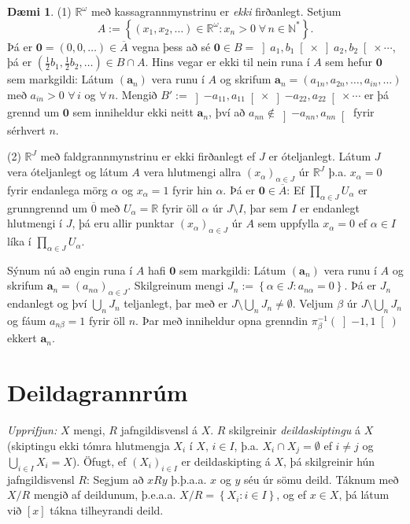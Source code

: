 \documentclass[a4paper,icelandic]{book}
\theoremstyle{definition}
\newtheorem{daemi}{Dæmi}[section]
\theoremstyle{plain}
\theoremstyle{remark}
\newcommand{\R}{\mathbb{R}} %
\newcommand{\N}{\mathbb{N}} %
\begin{document}
\begin{daemi}
  (1) $\R^\omega$ með kassagrannmynstrinu er \emph{ekki} firðanlegt. Setjum\[
  A := \left\{ (x_1,x_2,\dots)\in\R^\omega : x_n>0\;\forall\,n\in\N^* \right\}.
  \]
  Þá er $\mathbf 0 = \left( 0,0,\dots \right)\in \overline A$ vegna þess að
  sé $\mathbf 0\in B = \left] a_1,b_1 \right[\times\left] a_2,b_2
  \right[\times\cdots$, þá er $(\frac 12 b_1, \frac 12 b_2,\dots)\in B\cap A$.
  Hins vegar er ekki til nein runa í $A$ sem hefur $\mathbf 0$ sem markgildi:
  Látum $(\mathbf a_n)$ vera runu í $A$ og skrifum $\mathbf a_n =
  (a_{1n},a_{2n},\dots,a_{in},\dots)$ með $a_{in}>0$ $\forall\,i$ og $\forall\,n$.
  Mengið $B' := \left] -a_{11},a_{11} \right[\times\left] -a_{22},a_{22}
  \right[\times\cdots$ er þá grennd um $\mathbf 0$ sem inniheldur ekki neitt
  $\mathbf a_n$, því að $a_{nn}\notin \left]-a_{nn},a_{nn}\right[$ fyrir
  sérhvert $n$.

  (2) $\R^{J}$ með faldgrannmynstrinu er ekki firðanlegt ef $J$ er óteljanlegt.
  Látum $J$ vera óteljanlegt og látum $A$ vera hlutmengi allra
  $(x_{\alpha})_{\alpha\in J}$ úr $\R^J$ þ.a. $x_\alpha = 0$ fyrir endanlega
  mörg $\alpha$ og $x_\alpha = 1$ fyrir hin $\alpha$. Þá er $\mathbf 0\in
  \overline A$: Ef $\prod_{\alpha\in J} U_\alpha$ er grunngrennd um $\overline
  0$ með $U_\alpha = \R$ fyrir öll $\alpha$ úr $J\setminus I$, þar sem
  $I$ er endanlegt hlutmengi í $J$, þá eru allir punktar $(x_\alpha)_{\alpha\in
  J}$ úr $A$ sem uppfylla $x_\alpha = 0$ ef $\alpha\in I$ líka í
  $\prod_{\alpha\in J} U_\alpha$.

  Sýnum nú að engin runa í $A$ hafi $\mathbf 0$ sem markgildi: Látum
  $(\mathbf a_n)$ vera runu í $A$ og skrifum $\mathbf a_n =
  (a_{n\alpha})_{\alpha\in J}$. Skilgreinum mengi $J_n := \left\{ \alpha\in J :
  a_{n\alpha} = 0 \right\}$. Þá er $J_n$ endanlegt og því $\bigcup_{n} J_n$
  teljanlegt, þar með er $J\setminus\bigcup_n J_n \neq \emptyset$. Veljum
  $\beta$ úr $J\setminus \bigcup_n J_n$ og fáum $a_{n\beta}=1$ fyrir öll $n$.
  Þar með inniheldur opna grenndin $\pi_\beta^{-1}\left( \left] -1,1 \right[
  \right)$ ekkert $\mathbf a_n$.
\end{daemi}


\section{Deildagrannrúm}
\emph{Upprifjun:} $X$ mengi, $R$ jafngildisvensl á $X$. $R$ skilgreinir
\emph{deildaskiptingu} á $X$ (skiptingu ekki tómra
hlutmengja $X_i$ í $X$, $i\in I$, þ.a. $X_i\cap X_j=\emptyset$ ef $i\neq j$ og
$\bigcup_{i\in I} X_i = X$). Öfugt, ef $(X_i)_{i\in I}$
er deildaskipting á $X$, þá skilgreinir hún jafngildisvensl $R$: Segjum að
$xRy$ þ.þ.a.a. $x$ og $y$ séu úr sömu deild.
Táknum með $X/R$ mengið af deildunum, þ.e.a.a. $X/R = \left\{ X_i: i\in I
\right\}$, og ef $x\in X$, þá látum við $[x]$ tákna tilheyrandi deild.
\end{document}
